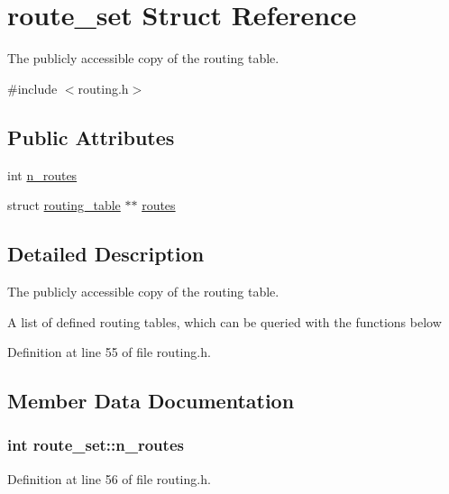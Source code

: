 \hypertarget{structroute__set}{\section{route\-\_\-set Struct Reference}
\label{structroute__set}
}


The publicly accessible copy of the routing table.  




{\ttfamily \#include $<$routing.\-h$>$}

\subsection*{Public Attributes}
\begin{DoxyCompactItemize}
\item 
int \hyperlink{structroute__set_ad4302290a2b2aaf50f105aae58926794}{n\-\_\-routes}
\item 
struct \hyperlink{structrouting__table}{routing\-\_\-table} $\ast$$\ast$ \hyperlink{structroute__set_a423016a014c4eb12726597161ec0b6f9}{routes}
\end{DoxyCompactItemize}


\subsection{Detailed Description}
The publicly accessible copy of the routing table. 

A list of defined routing tables, which can be queried with the functions below 

Definition at line 55 of file routing.\-h.



\subsection{Member Data Documentation}
\hypertarget{structroute__set_ad4302290a2b2aaf50f105aae58926794}{
\subsubsection[{n\-\_\-routes}]{\setlength{\rightskip}{0pt plus 5cm}int route\-\_\-set\-::n\-\_\-routes}}\label{structroute__set_ad4302290a2b2aaf50f105aae58926794}


Definition at line 56 of file routing.\-h.

